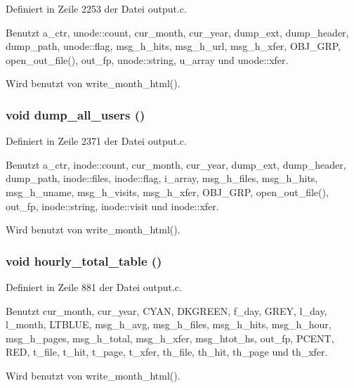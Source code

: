 Definiert in Zeile 2253 der Datei output.c.

Benutzt a\_\-ctr, unode::count, cur\_\-month, cur\_\-year, dump\_\-ext, dump\_\-header, dump\_\-path, unode::flag, msg\_\-h\_\-hits, msg\_\-h\_\-url, msg\_\-h\_\-xfer, OBJ\_\-GRP, open\_\-out\_\-file(), out\_\-fp, unode::string, u\_\-array und unode::xfer.

Wird benutzt von write\_\-month\_\-html().
\subsubsection{\setlength{\rightskip}{0pt plus 5cm}void dump\_\-all\_\-users ()}\label{output_8c_a519e8d866cad7c01f72636d749a9f57}




Definiert in Zeile 2371 der Datei output.c.

Benutzt a\_\-ctr, inode::count, cur\_\-month, cur\_\-year, dump\_\-ext, dump\_\-header, dump\_\-path, inode::files, inode::flag, i\_\-array, msg\_\-h\_\-files, msg\_\-h\_\-hits, msg\_\-h\_\-uname, msg\_\-h\_\-visits, msg\_\-h\_\-xfer, OBJ\_\-GRP, open\_\-out\_\-file(), out\_\-fp, inode::string, inode::visit und inode::xfer.

Wird benutzt von write\_\-month\_\-html().
\subsubsection{\setlength{\rightskip}{0pt plus 5cm}void hourly\_\-total\_\-table ()}\label{output_8c_bed9fdc7ecf13c9399e3e41bd583abd9}




Definiert in Zeile 881 der Datei output.c.

Benutzt cur\_\-month, cur\_\-year, CYAN, DKGREEN, f\_\-day, GREY, l\_\-day, l\_\-month, LTBLUE, msg\_\-h\_\-avg, msg\_\-h\_\-files, msg\_\-h\_\-hits, msg\_\-h\_\-hour, msg\_\-h\_\-pages, msg\_\-h\_\-total, msg\_\-h\_\-xfer, msg\_\-htot\_\-hs, out\_\-fp, PCENT, RED, t\_\-file, t\_\-hit, t\_\-page, t\_\-xfer, th\_\-file, th\_\-hit, th\_\-page und th\_\-xfer.

Wird benutzt von write\_\-month\_\-html().
